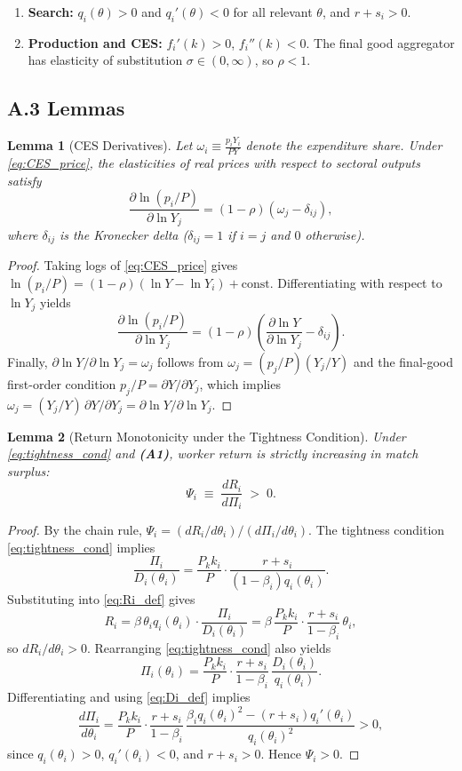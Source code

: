 \documentclass[12pt]{article} %
\newtheorem{lemma}{Lemma}
\theoremstyle{remark}
\begin{document}
\begin{enumerate}[label=\textbf{(A\arabic*)}, leftmargin=2cm]
\item \label{ass:DMP} \textbf{Search:} $q_i(\theta)>0$ and $q_i'(\theta)<0$ for all relevant $\theta$, and $r+s_i>0$.
\item \label{ass:CES} \textbf{Production and CES:} $f_i'(k)>0$, $f_i''(k)<0$. The final good aggregator has elasticity of substitution $\sigma\in(0,\infty)$, so $\rho<1$.
\end{enumerate}

\subsection*{A.3 Lemmas}

\begin{lemma}[CES Derivatives]\label{lem:CES_derivs}
Let $\omega_i \equiv \frac{p_i Y_i}{P Y}$ denote the expenditure share. Under \eqref{eq:CES_price}, the elasticities of real prices with respect to sectoral outputs satisfy
\[
\frac{\partial \ln (p_i/P)}{\partial \ln Y_j} = (1-\rho)(\omega_j - \delta_{ij}),
\]
where $\delta_{ij}$ is the Kronecker delta ($\delta_{ij}=1$ if $i=j$ and $0$ otherwise).
\end{lemma}

\begin{proof}
Taking logs of \eqref{eq:CES_price} gives $\ln(p_i/P)=(1-\rho)(\ln Y-\ln Y_i)+\text{const.}$ Differentiating with respect to $\ln Y_j$ yields
\[
\frac{\partial \ln (p_i/P)}{\partial \ln Y_j}
=(1-\rho)\left(\frac{\partial \ln Y}{\partial \ln Y_j}-\delta_{ij}\right).
\]
Finally, $\partial \ln Y/\partial \ln Y_j=\omega_j$ follows from $\omega_j=(p_j/P)(Y_j/Y)$ and the final-good first-order condition $p_j/P=\partial Y/\partial Y_j$, which implies $\omega_j=(Y_j/Y)\,\partial Y/\partial Y_j=\partial \ln Y/\partial \ln Y_j$.
\end{proof}

\begin{lemma}[Return Monotonicity under the Tightness Condition]\label{lem:Psi_pos}
Under \eqref{eq:tightness_cond} and \textbf{(A1)}, worker return is strictly increasing in match surplus:
\[
\Psi_i \;\equiv\; \frac{dR_i}{d\Pi_i} \;>\; 0.
\]
\end{lemma}

\begin{proof}
By the chain rule, $\Psi_i=(dR_i/d\theta_i)/(d\Pi_i/d\theta_i)$. The tightness condition \eqref{eq:tightness_cond} implies
\[
\frac{\Pi_i}{D_i(\theta_i)}
=\frac{P_k k_i}{P}\cdot\frac{r+s_i}{(1-\beta_i)q_i(\theta_i)}.
\]
Substituting into \eqref{eq:Ri_def} gives
\[
R_i=\beta\,\theta_i q_i(\theta_i)\cdot\frac{\Pi_i}{D_i(\theta_i)}
=\beta\,\frac{P_k k_i}{P}\cdot\frac{r+s_i}{1-\beta_i}\,\theta_i,
\]
so $dR_i/d\theta_i>0$. Rearranging \eqref{eq:tightness_cond} also yields
\[
\Pi_i(\theta_i)
=\frac{P_k k_i}{P}\cdot\frac{r+s_i}{1-\beta_i}\,\frac{D_i(\theta_i)}{q_i(\theta_i)}.
\]
Differentiating and using \eqref{eq:Di_def} implies
\[
\frac{d\Pi_i}{d\theta_i}
=\frac{P_k k_i}{P}\cdot\frac{r+s_i}{1-\beta_i}\,
\frac{\beta_i q_i(\theta_i)^2-(r+s_i)q_i'(\theta_i)}{q_i(\theta_i)^2}>0,
\]
since $q_i(\theta_i)>0$, $q_i'(\theta_i)<0$, and $r+s_i>0$. Hence $\Psi_i>0$.
\end{proof}
\end{document}
